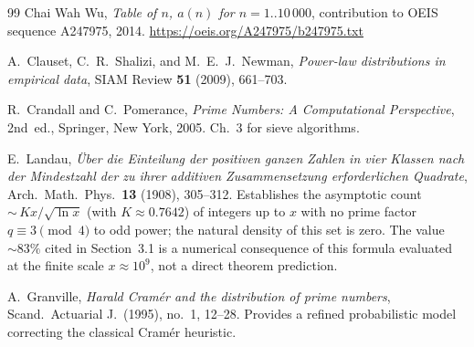 \documentclass[12pt]{article}
\begin{document}
\begin{thebibliography}{99}
	Chai Wah Wu,
	\textit{Table of $n$, $a(n)$ for $n = 1..10\,000$},
	contribution to OEIS sequence A247975, 2014.
	\url{https://oeis.org/A247975/b247975.txt}
	
	A.~Clauset, C.~R.~Shalizi, and M.~E.~J.~Newman,
	\textit{Power-law distributions in empirical data},
	SIAM Review \textbf{51} (2009), 661--703.
	
	R.~Crandall and C.~Pomerance,
	\textit{Prime Numbers: A Computational Perspective},
	2nd~ed., Springer, New York, 2005.
	Ch.~3 for sieve algorithms.
	
	E.~Landau,
	\textit{\"Uber die Einteilung der positiven ganzen Zahlen in vier
		Klassen nach der Mindestzahl der zu ihrer additiven Zusammensetzung
		erforderlichen Quadrate},
	Arch.\ Math.\ Phys.\ \textbf{13} (1908), 305--312.
	Establishes the asymptotic count ${\sim}\,Kx/\sqrt{\ln x}$
	(with $K \approx 0.7642$) of integers up to $x$ with no prime factor
	$q \equiv 3 \pmod{4}$ to odd power; the natural density of this
	set is zero.
	The value ${\sim}83\%$ cited in Section~3.1 is a numerical consequence
	of this formula evaluated at the finite scale $x \approx 10^9$,
	not a direct theorem prediction.
	
	A.~Granville,
	\textit{Harald Cram\'er and the distribution of prime numbers},
	Scand.\ Actuarial J.\ (1995), no.~1, 12--28.
	Provides a refined probabilistic model correcting the classical
	Cram\'er heuristic.
	
\end{thebibliography}
\end{document}
